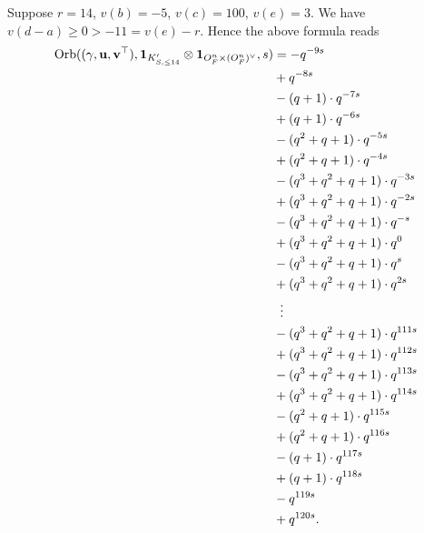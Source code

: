 \begin{example}
  Suppose $r = 14$, $v(b) = -5$, $v(c) = 100$, $v(e) = 3$.
  We have $v(d-a) \ge 0 > -11 = v(e) - r$.
  Hence the above formula reads
  \begin{align*}
    \Orb(\guv, \mathbf{1}_{K'_{S, \le 14}} \otimes \oneV, s)
    &= -q^{-9s} \\
    &+ q^{-8s} \\
    &- (q+1) \cdot q^{-7s} \\
    &+ (q+1) \cdot q^{-6s} \\
    &- (q^2+q+1) \cdot q^{-5s} \\
    &+ (q^2+q+1) \cdot q^{-4s} \\
    &- (q^3+q^2+q+1) \cdot q^{-3s} \\
    &+ (q^3+q^2+q+1) \cdot q^{-2s} \\
    &- (q^3+q^2+q+1) \cdot q^{-s} \\
    &+ (q^3+q^2+q+1) \cdot q^{0} \\
    &- (q^3+q^2+q+1) \cdot q^{s} \\
    &+ (q^3+q^2+q+1) \cdot q^{2s} \\
    &\vdotswithin= \\
    &- (q^3+q^2+q+1) \cdot q^{111s} \\
    &+ (q^3+q^2+q+1) \cdot q^{112s} \\
    &- (q^3+q^2+q+1) \cdot q^{113s} \\
    &+ (q^3+q^2+q+1) \cdot q^{114s} \\
    &- (q^2+q+1) \cdot q^{115s} \\
    &+ (q^2+q+1) \cdot q^{116s} \\
    &- (q+1) \cdot q^{117s} \\
    &+ (q+1) \cdot q^{118s} \\
    &- q^{119s} \\
    &+ q^{120s}.
  \end{align*}
\end{example}
